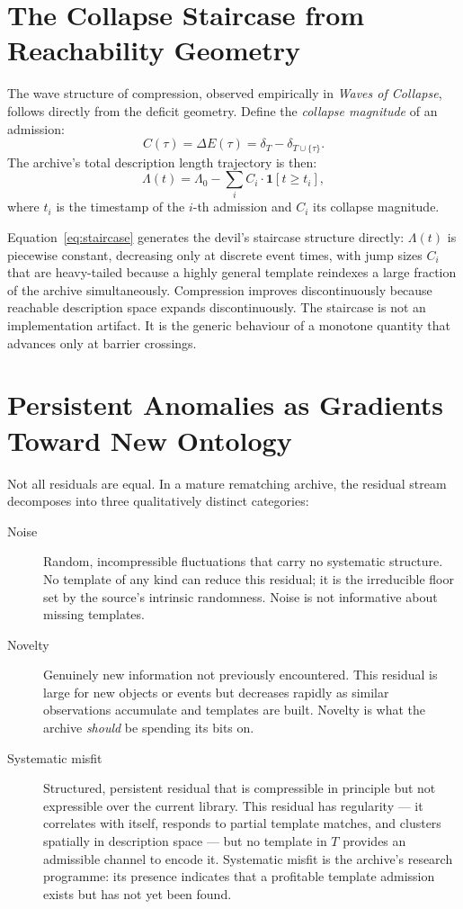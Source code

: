 \documentclass[11pt, a4paper, openany]{book}
\theoremstyle{plain}
\theoremstyle{definition}
\theoremstyle{remark}
\begin{document}
\section{The Collapse Staircase from Reachability Geometry}

The wave structure of compression, observed empirically in
\emph{Waves of Collapse}, follows directly from the deficit geometry.
Define the \emph{collapse magnitude} of an admission:
\[
  C(\tau) = \Delta E(\tau) = \delta_T - \delta_{T \cup \{\tau\}}.
\]
The archive's total description length trajectory is then:
\begin{equation}
  \Lambda(t) = \Lambda_0 - \sum_{i} C_i \cdot \mathbf{1}[t \geq t_i],
  \label{eq:staircase}
\end{equation}
where $t_i$ is the timestamp of the $i$-th admission and $C_i$ its collapse magnitude.

Equation~\eqref{eq:staircase} generates the devil's staircase structure directly:
$\Lambda(t)$ is piecewise constant, decreasing only at discrete event times,
with jump sizes $C_i$ that are heavy-tailed because a highly general template
reindexes a large fraction of the archive simultaneously.
Compression improves discontinuously because reachable description space
expands discontinuously.
The staircase is not an implementation artifact.
It is the generic behaviour of a monotone quantity that advances only at barrier crossings.

\section{Persistent Anomalies as Gradients Toward New Ontology}

Not all residuals are equal.
In a mature rematching archive, the residual stream decomposes into three
qualitatively distinct categories:

\begin{description}
  \item[Noise] Random, incompressible fluctuations that carry no systematic
    structure.
    No template of any kind can reduce this residual; it is the irreducible
    floor set by the source's intrinsic randomness.
    Noise is not informative about missing templates.

  \item[Novelty] Genuinely new information not previously encountered.
    This residual is large for new objects or events but decreases rapidly
    as similar observations accumulate and templates are built.
    Novelty is what the archive \emph{should} be spending its bits on.

  \item[Systematic misfit] Structured, persistent residual that is
    compressible in principle but not expressible over the current library.
    This residual has regularity --- it correlates with itself, responds
    to partial template matches, and clusters spatially in description space
    --- but no template in $T$ provides an admissible channel to encode it.
    Systematic misfit is the archive's research programme:
    its presence indicates that a profitable template admission exists
    but has not yet been found.
\end{description}
\end{document}
